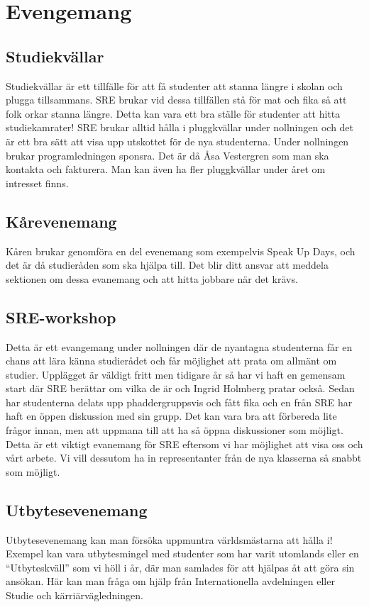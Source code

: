 \documentclass[10pt]{article}
\begin{document}
\section{Evengemang}

\subsection{Studiekvällar}
Studiekvällar är ett tillfälle för att få studenter att stanna längre i skolan och plugga tillsammans. SRE brukar vid dessa tillfällen stå för mat och fika så att folk orkar stanna längre. Detta kan vara ett bra ställe för studenter att hitta studiekamrater! SRE brukar alltid hålla i pluggkvällar under nollningen och det är ett bra sätt att visa upp utskottet för de nya studenterna. Under nollningen brukar programledningen sponsra. Det är då Åsa Vestergren som man ska kontakta och fakturera. Man kan även ha fler pluggkvällar under året om intresset finns.

\subsection{Kårevenemang}
Kåren brukar genomföra en del evenemang som exempelvis Speak Up Days, och det är då studieråden som ska hjälpa till. Det blir ditt ansvar att meddela sektionen om dessa evanemang och att hitta jobbare när det krävs.

\subsection{SRE-workshop}
Detta är ett evangemang under nollningen där de nyantagna studenterna får en chans att lära känna studierådet och får möjlighet att prata om allmänt om studier. Upplägget är väldigt fritt men tidigare år så har vi haft en gemensam start där SRE berättar om vilka de är och Ingrid Holmberg pratar också. Sedan har studenterna delats upp phaddergruppsvis och fått fika och en från SRE har haft en öppen diskussion med sin grupp. Det kan vara bra att förbereda lite frågor innan, men att uppmana till att ha så öppna diskussioner som möjligt. Detta är ett viktigt evanemang för SRE eftersom vi har möjlighet att visa oss och vårt arbete. Vi vill dessutom ha in representanter från de nya klasserna så snabbt som möjligt.

\subsection{Utbytesevenemang}
Utbytesevenemang kan man försöka uppmuntra världsmästarna att hålla i! Exempel kan vara utbytesmingel med studenter som har varit utomlands eller en “Utbyteskväll” som vi höll i år, där man samlades för att hjälpas åt att göra sin ansökan. Här kan man fråga om hjälp från Internationella avdelningen eller Studie och kärriärvägledningen. 
\end{document}
